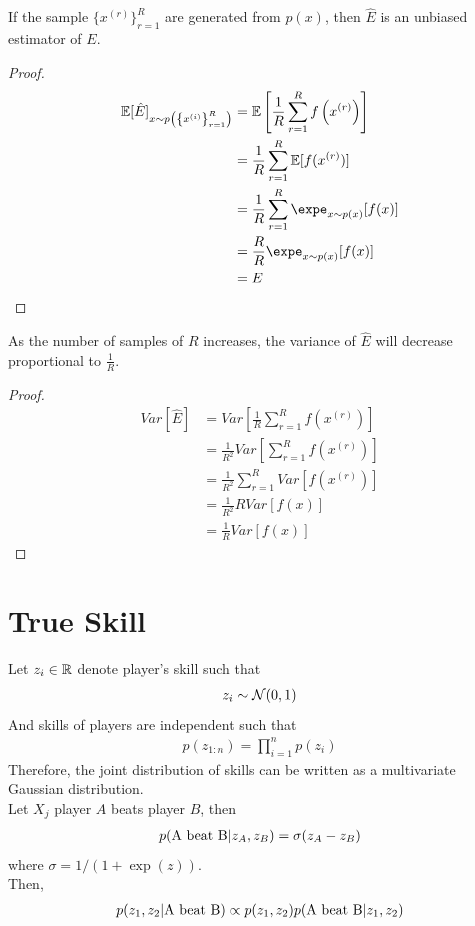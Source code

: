 \documentclass{article}
\begin{document}
	\begin{proposition}
		If the sample $\{x^{(r)}\}_{r=1}^R$ are generated from $p(x)$, then $\hat{E}$ is an unbiased estimator of $E$.
	\end{proposition}
	
	\begin{proof}
		\begin{align}
			\mathbb{E}[\hat{E}]_{x \sim p\left(\left\{x^{(i)}\right\}_{r=1}^{R}\right)}
			&= \mathbb{E}\left[\frac{1}{R} \sum_{r=1}^{R} f\left(x^{(r)}\right)\right] \\
			&= \frac{1}{R} \sum_{r=1}^R \expect{f(x^{(r)})} \\
			&= \frac{1}{R} \sum_{r=1}^{R} \expe_{x \sim p(x)}[f(x)] \\
			&= \frac{R}{R} \expe_{x \sim p(x)}[f(x)] \\
			&= E
		\end{align}
	\end{proof}
	
	\begin{proposition}
		As the number of samples of $R$ increases, the variance of $\hat{E}$ will decrease proportional to $\frac{1}{R}$.
	\end{proposition}
	
	\begin{proof}
		\begin{align}
			Var[\hat{E}] &= Var[\frac{1}{R} \sum_{r=1}^R f(x^{(r)})] \\
			&= \frac{1}{R^2} Var[\sum_{r=1}^R f(x^{(r)})] \\
			&= \frac{1}{R^2} \sum_{r=1}^R Var[f(x^{(r)})] \\
			&= \frac{1}{R^2} R Var[f(x)] \\
			&= \frac{1}{R} Var[f(x)]
		\end{align}
	\end{proof}

	\section{True Skill}
	\par Let $z_i \in \mathbb{R}$ denote player's skill such that
	\begin{align}
		z_i \sim \mathcal{{N}}(0, 1)
	\end{align}
	And skills of players are independent such that
	\begin{align}
		p(z_{1:n}) = \prod_{i=1}^np(z_i)
	\end{align}
	Therefore, the joint distribution of skills can be written as a multivariate Gaussian distribution. \\
	Let $X_j$ player $A$ beats player $B$, then
	\begin{align}
		p(\text{{A beat B}}|z_A, z_B) = \sigma(z_A - z_B)
	\end{align}
	where $\sigma = 1 / (1 + \exp(z))$. \\
	Then,
	\begin{align}
		p(z_1, z_2 | \text{{A beat B}}) \propto p(z_1, z_2) p(\text{{A beat B}}|z_1, z_2)
	\end{align}
\end{document}
